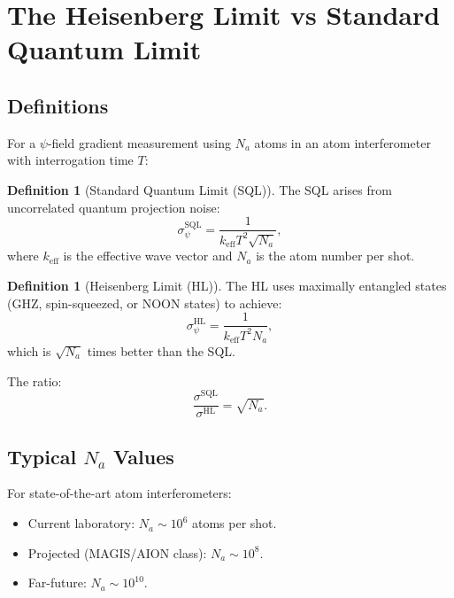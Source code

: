 \documentclass[11pt]{article}
\theoremstyle{definition}
\newtheorem{definition}[theorem]{Definition}
\theoremstyle{remark}
\begin{document}
\section{The Heisenberg Limit vs Standard Quantum Limit}
\label{sec:P9-HL-SQL}

\subsection{Definitions}

For a $\psi$-field gradient measurement using $N_a$ atoms in an atom
interferometer with interrogation time $T$:

\begin{definition}[Standard Quantum Limit (SQL)]
\label{def:SQL}
The SQL arises from uncorrelated quantum projection noise:
\begin{equation}
\sigma_\psi^{\mathrm{SQL}} = \frac{1}{k_{\mathrm{eff}} T^2 \sqrt{N_a}},
\label{eq:SQL}
\end{equation}
where $k_{\mathrm{eff}}$ is the effective wave vector and $N_a$ is the
atom number per shot.
\end{definition}

\begin{definition}[Heisenberg Limit (HL)]
\label{def:HL}
The HL uses maximally entangled states (GHZ, spin-squeezed, or NOON states)
to achieve:
\begin{equation}
\sigma_\psi^{\mathrm{HL}} = \frac{1}{k_{\mathrm{eff}} T^2 N_a},
\label{eq:HL}
\end{equation}
which is $\sqrt{N_a}$ times better than the SQL.
\end{definition}

The ratio:
\begin{equation}
\frac{\sigma^{\mathrm{SQL}}}{\sigma^{\mathrm{HL}}} = \sqrt{N_a}.
\label{eq:SQL-HL-ratio}
\end{equation}

\subsection{Typical $N_a$ Values}

For state-of-the-art atom interferometers:
\begin{itemize}[nosep]
\item Current laboratory: $N_a \sim 10^6$ atoms per shot.
\item Projected (MAGIS/AION class): $N_a \sim 10^8$.
\item Far-future: $N_a \sim 10^{10}$.
\end{itemize}
\end{document}
